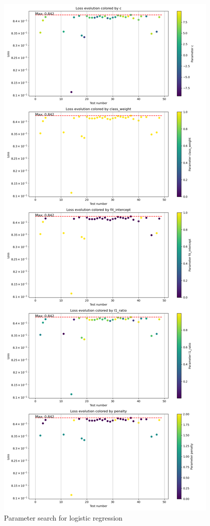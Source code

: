 \documentclass{article}
\begin{document}
\begin{figure}
    \centering
    \includegraphics{report_img/param_search/logistic_regression}
    \caption{Parameter search for logistic regression}
    \label{fig:}
\end{figure}
\end{document}
